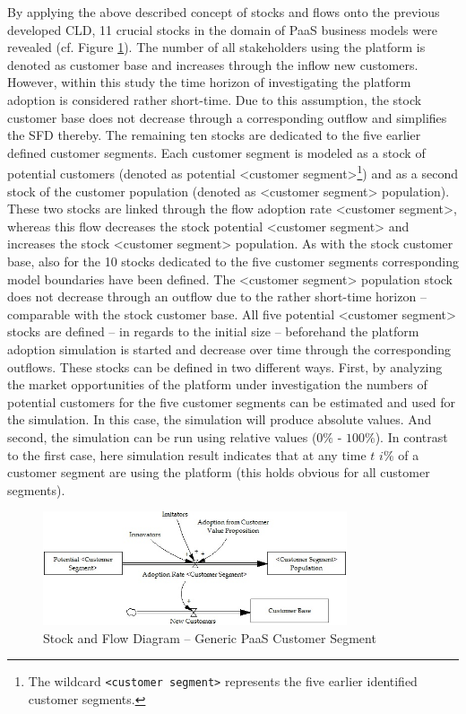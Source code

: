 By applying the above described concept of stocks and flows onto the previous developed \ac{CLD}, 11 crucial stocks in the domain of \ac{PaaS} business models were revealed (cf. Figure \ref{fig:sfd_cs}). The number of all stakeholders using the platform is denoted as customer base and increases through the inflow new customers. However, within this study the time horizon of investigating the platform adoption is considered rather short-time. Due to this assumption, the stock customer base does not decrease through a corresponding outflow and simplifies the \ac{SFD} thereby. The remaining ten stocks are dedicated to the five earlier defined customer segments. Each customer segment is modeled as a stock of potential customers (denoted as potential <customer segment>\footnote{The wildcard \texttt{<customer segment>} represents the five earlier identified customer segments.}) and as a second stock of the customer population (denoted as <customer segment> population). These two stocks are linked through the flow adoption rate <customer segment>, whereas this flow decreases the stock potential <customer segment> and increases the stock <customer segment> population. As with the stock customer base, also for the 10 stocks dedicated to the five customer segments corresponding model boundaries have been defined. The <customer segment> population stock does not decrease through an outflow due to the rather short-time horizon -- comparable with the stock customer base. All five potential <customer segment> stocks are defined -- in regards to the initial size -- beforehand the platform adoption simulation is started and decrease over time through the corresponding outflows. These stocks can be defined in two different ways. First, by analyzing the market opportunities of the platform under investigation the numbers of potential customers for the five customer segments can be estimated and used for the simulation. In this case, the simulation will produce absolute values. And second, the simulation can be run using relative values ($0\%$ - $100\%$). In contrast to the first case, here simulation result indicates that at any time $t$ $i\%$ of a customer segment are using the platform (this holds obvious for all customer segments).

\begin{figure}[tb]
	\centering
	\includegraphics[width=0.8\textwidth]{gfx/sfd_customerSegment}
	\caption{Stock and Flow Diagram -- Generic PaaS Customer Segment}
	\label{fig:sfd_cs}
\end{figure}

